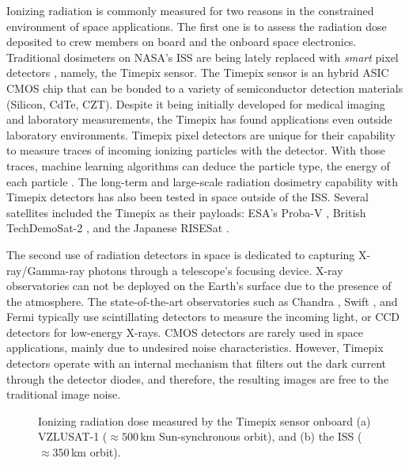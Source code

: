 \documentclass[a4paper,11pt,twoside,openright]{book}
\begin{document}
Ionizing radiation is commonly measured for two reasons in the constrained environment of space applications.
The first one is to assess the radiation dose deposited to crew members on board and the onboard space electronics.
Traditional dosimeters on NASA's \ac{ISS} are being lately replaced with \emph{smart} pixel detectors \cite{turecek2011small, stoffle2015timepix, pinsky2019timepix}, namely, the Timepix sensor.
The Timepix sensor \cite{llopart2007timepix, poikela2014timepix3} is an hybrid \ac{ASIC} \ac{CMOS} chip that can be bonded to a variety of semiconductor detection materials (Silicon, \acs{CdTe}, \acs{CZT}).
Despite it being initially developed for medical imaging \cite{ballabriga2018asic} and laboratory measurements, the Timepix has found applications even outside laboratory environments.
Timepix pixel detectors are unique for their capability to measure traces of incoming ionizing particles with the detector.
With those traces, machine learning algorithms can deduce the particle type, the energy of each particle \cite{granja2018resolving, baca2019timepix}.
The long-term and large-scale radiation dosimetry capability with Timepix detectors has also been tested in space outside of the \ac{ISS}.
Several satellites included the Timepix as their payloads: ESA's Proba-V \cite{granja2014directional, granja2016satram}, British TechDemoSat-2 \cite{furnell2018first}, and the Japanese RISESat \cite{filgas2019risepix}.

The second use of radiation detectors in space is dedicated to capturing X-ray/Gamma-ray photons through a telescope's focusing device.
X-ray observatories can not be deployed on the Earth's surface due to the presence of the atmosphere.
The state-of-the-art observatories such as Chandra \cite{weisskopf2000chandra}, Swift \cite{gehrels2004swift}, and Fermi \cite{atwood2009large} typically use scintillating detectors to measure the incoming light, or \acs{CCD} detectors for low-energy X-rays.
\ac{CMOS} detectors are rarely used in space applications, mainly due to undesired noise characteristics.
However, Timepix detectors operate with an internal mechanism that filters out the dark current through the detector diodes, and therefore, the resulting images are free to the traditional image noise.


\begin{figure}[!h]
  \centering
  \caption{Ionizing radiation dose measured by the Timepix sensor onboard (a) VZLUSAT-1 ($\approx 500$\,km Sun-synchronous orbit), and (b) the \acl{ISS} ($\approx 350$\,km orbit).}
  \label{fig:intro_radiation_maps}
\end{figure}
\end{document}
